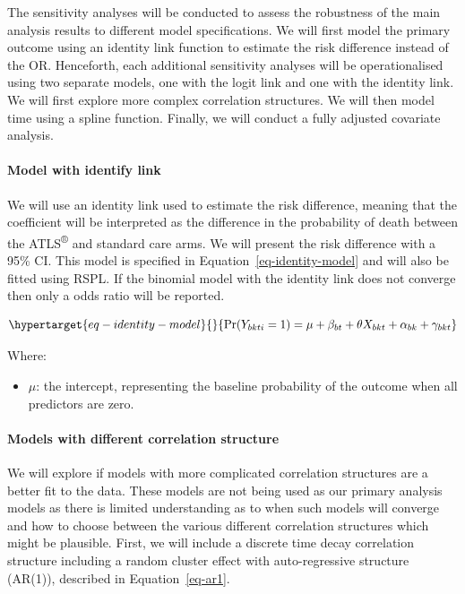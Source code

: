 \documentclass[
]{scrartcl}
\let\oldparagraph\paragraph
\renewcommand{\paragraph}[1]{\oldparagraph{#1}\mbox{}}
\providecommand{\tightlist}{%
  \setlength{\itemsep}{0pt}\setlength{\parskip}{0pt}}\usepackage{longtable,booktabs,array}
\begin{document}
The sensitivity analyses will be conducted to assess the robustness of
the main analysis results to different model specifications. We will
first model the primary outcome using an identity link function to
estimate the risk difference instead of the OR. Henceforth, each
additional sensitivity analyses will be operationalised using two
separate models, one with the logit link and one with the identity link.
We will first explore more complex correlation structures. We will then
model time using a spline function. Finally, we will conduct a fully
adjusted covariate analysis.

\hypertarget{model-with-identify-link}{%
\paragraph{Model with identify link}\label{model-with-identify-link}}

We will use an identity link used to estimate the risk difference,
meaning that the coefficient will be interpreted as the difference in
the probability of death between the ATLS\textsuperscript{®} and
standard care arms. We will present the risk difference with a 95\% CI.
This model is specified in Equation~\ref{eq-identity-model} and will
also be fitted using RSPL. If the binomial model with the identity link
does not converge then only a odds ratio will be reported.

\begin{equation}\protect\hypertarget{eq-identity-model}{}{
\text{Pr}(Y_{bkti} = 1) = \mu + \beta_{bt} + \theta X_{bkt} + \alpha_{bk} + \gamma_{bkt} 
}\label{eq-identity-model}\end{equation}

Where:

\begin{itemize}
\tightlist
\item
  \(\mu\): the intercept, representing the baseline probability of the
  outcome when all predictors are zero.
\end{itemize}

\hypertarget{models-with-different-correlation-structure}{%
\paragraph{Models with different correlation
structure}\label{models-with-different-correlation-structure}}

We will explore if models with more complicated correlation structures
are a better fit to the data. These models are not being used as our
primary analysis models as there is limited understanding as to when
such models will converge and how to choose between the various
different correlation structures which might be plausible. First, we
will include a discrete time decay correlation structure including a
random cluster effect with auto-regressive structure (AR(1)), described
in Equation~\ref{eq-ar1}.
\end{document}

